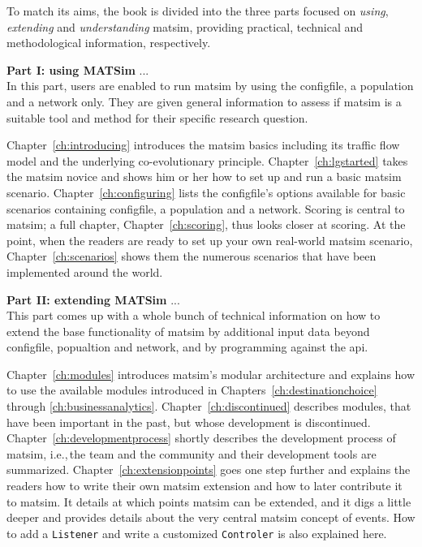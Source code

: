 To match its aims, the book is divided into the three parts focused on \emph{using}, \emph{extending} and \emph{understanding} \gls{matsim}, providing practical, technical and methodological information, respectively. %

\textbf{Part I: using MATSim} ... \\
In this part, users are enabled to run \gls{matsim} by using the \gls{configfile}, a population and a network only. They are given general information to assess if \gls{matsim} is a suitable tool and method for their specific research question.

Chapter~\ref{ch:introducing} introduces the \gls{matsim} basics including its traffic flow model and the underlying co-evolutionary principle. 
Chapter~\ref{ch:lgstarted} takes the \gls{matsim} novice and shows him or her how to set up and run a basic \gls{matsim} \gls{scenario}. 
Chapter~\ref{ch:configuring} lists the \gls{configfile}'s options available for basic scenarios containing \gls{configfile}, a population and a network.  
Scoring is central to \gls{matsim}; a full chapter, Chapter~\ref{ch:scoring}, thus looks closer at scoring. 
At the point, when the readers are ready to set up your own real-world \gls{matsim} \gls{scenario}, Chapter~\ref{ch:scenarios} shows them the numerous scenarios that have been implemented around the world. 

\textbf{Part II: extending MATSim} ... \\
This part comes up with a whole bunch of technical information on how to extend the base functionality of \gls{matsim} by additional input data beyond \gls{configfile}, popualtion and network, and by programming against the \gls{api}. 

Chapter~\ref{ch:modules} introduces \gls{matsim}'s modular architecture and explains how to use the available \glspl{module} introduced in Chapters~\ref{ch:destinationchoice} through \ref{ch:businessanalytics}. Chapter~\ref{ch:discontinued} describes modules, that have been important in the past, but whose development is discontinued.
Chapter~\ref{ch:developmentprocess} shortly describes the development process of \gls{matsim}, i.e.,\,the team and the community and their development tools are summarized. 
Chapter~\ref{ch:extensionpoints} goes one step further and explains the readers how to write their own \gls{matsim} \gls{extension} and how to later contribute it to \gls{matsim}. It details at which points \gls{matsim} can be extended, and it digs a little deeper and provides details about the very central \gls{matsim} concept of \glspl{event}. How to add a \lstinline|Listener| and write a customized \lstinline|Controler| is also explained here.

